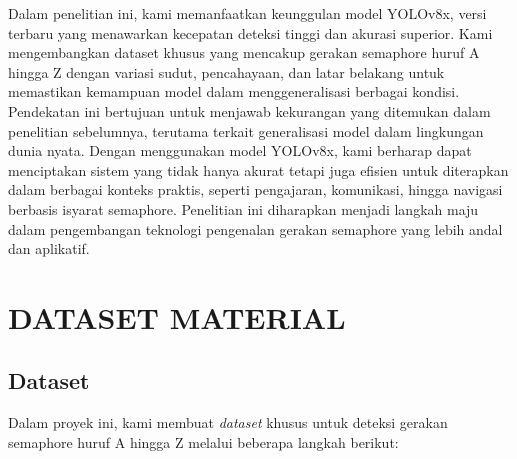 \documentclass[12pt,a4paper]{article}
\begin{document}
\begin{adjustwidth}{3em}{0pt}
\hspace{0.5cm} Dalam penelitian ini, kami memanfaatkan keunggulan model YOLOv8x, versi terbaru yang menawarkan kecepatan deteksi tinggi dan akurasi superior. Kami mengembangkan dataset khusus yang mencakup gerakan semaphore huruf A hingga Z dengan variasi sudut, pencahayaan, dan latar belakang untuk memastikan kemampuan model dalam menggeneralisasi berbagai kondisi. Pendekatan ini bertujuan untuk menjawab kekurangan yang ditemukan dalam penelitian sebelumnya, terutama terkait generalisasi model dalam lingkungan dunia nyata. Dengan menggunakan model YOLOv8x, kami berharap dapat menciptakan sistem yang tidak hanya akurat tetapi juga efisien untuk diterapkan dalam berbagai konteks praktis, seperti pengajaran, komunikasi, hingga navigasi berbasis isyarat semaphore. Penelitian ini diharapkan menjadi langkah maju dalam pengembangan teknologi pengenalan gerakan semaphore yang lebih andal dan aplikatif.
\end{adjustwidth}

\section{DATASET MATERIAL}
\subsection{Dataset}

Dalam proyek ini, kami membuat \textit{dataset} khusus untuk deteksi gerakan semaphore huruf A hingga Z melalui beberapa langkah berikut:
\end{document}
